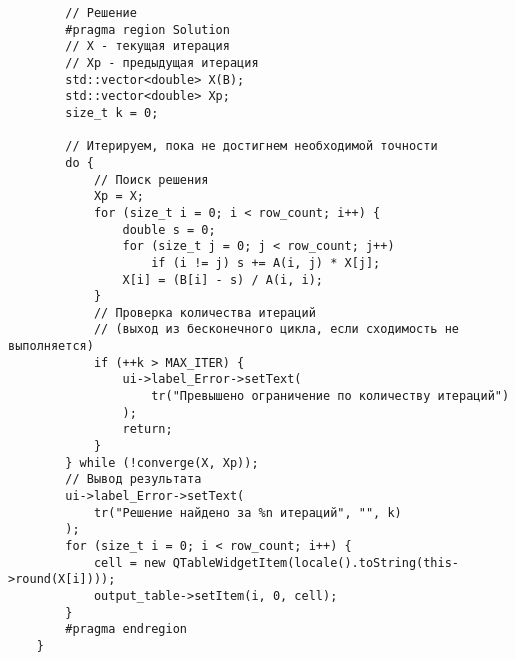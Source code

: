\documentclass{article}
\begin{document}
\begin{verbatim}
        // Решение
        #pragma region Solution
        // X - текущая итерация
        // Xp - предыдущая итерация
        std::vector<double> X(B);
        std::vector<double> Xp;
        size_t k = 0;

        // Итерируем, пока не достигнем необходимой точности
        do {
            // Поиск решения
            Xp = X;
            for (size_t i = 0; i < row_count; i++) {
                double s = 0;
                for (size_t j = 0; j < row_count; j++)
                    if (i != j) s += A(i, j) * X[j];
                X[i] = (B[i] - s) / A(i, i);
            }
            // Проверка количества итераций
            // (выход из бесконечного цикла, если сходимость не выполняется)
            if (++k > MAX_ITER) {
                ui->label_Error->setText(
                    tr("Превышено ограничение по количеству итераций")
                );
                return;
            }
        } while (!converge(X, Xp));
        // Вывод результата
        ui->label_Error->setText(
            tr("Решение найдено за %n итераций", "", k)
        );
        for (size_t i = 0; i < row_count; i++) {
            cell = new QTableWidgetItem(locale().toString(this->round(X[i])));
            output_table->setItem(i, 0, cell);
        }
        #pragma endregion
    }
\end{verbatim}
\end{document}
